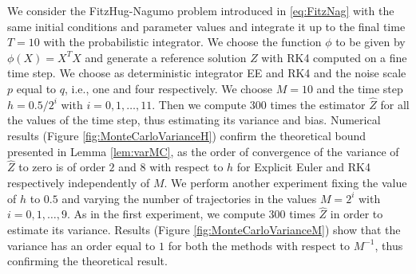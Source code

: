 We consider the FitzHug-Nagumo problem introduced in \eqref{eq:FitzNag} with the same initial conditions and parameter values and integrate it up to the final time $T = 10$ with the probabilistic integrator. We choose the function $\phi$ to be given by $\phi(X) = X^TX$ and generate a reference solution $Z$ with RK4 computed on a fine time step. We choose as deterministic integrator EE and RK4 and the noise scale $p$ equal to $q$, i.e., one and four respectively. We choose $M = 10$ and the time step $h = 0.5 / 2^i$ with $i = 0, 1, \ldots, 11$. Then we compute $300$ times the estimator $\hat Z$ for all the values of the time step, thus estimating its variance and bias. Numerical results (Figure \ref{fig:MonteCarloVarianceH}) confirm the theoretical bound presented in Lemma \ref{lem:varMC}, as the order of convergence of the variance of $\hat{Z}$ to zero is of order $2$ and $8$ with respect to $h$ for Explicit Euler and RK4 respectively independently of $M$. We perform another experiment fixing the value of $h$ to $0.5$ and varying the number of trajectories in the values $M = 2^i$ with $i = 0, 1, \ldots, 9$. As in the first experiment, we compute 300 times $\hat Z$ in order to estimate its variance. Results (Figure \ref{fig:MonteCarloVarianceM}) show that the variance has an order equal to $1$ for both the methods with respect to $M^{-1}$, thus confirming the theoretical result.


